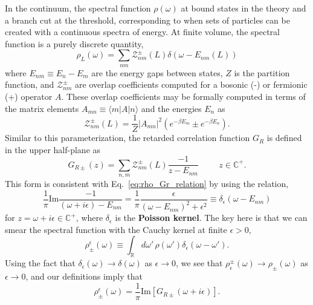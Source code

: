 In the continuum, the spectral function $\rho(\omega)$ at bound states in the theory and a branch cut at the threshold, corresponding to when sets of particles can be created with a continuous spectra of energy. At finite volume, the spectral function is a purely discrete quantity, 
\begin{equation}
    \rho_L(\omega) = \sum_{nm} \mathcal Z_{nm}^\pm(L) \delta(\omega - E_{nm}(L))
\end{equation}
where $E_{nm}\equiv E_n - E_m$ are the energy gaps between states, $Z$ is the partition function, and $\mathcal Z_{nm}^\pm$ are overlap coefficients computed for a bosonic (-) or fermionic (+) operator $A$. These overlap coefficients may be formally computed in terms of the matrix elements $A_{mn}\equiv \langle m | A | n\rangle$ and the energies $E_n$ as
\begin{equation}
    \mathcal Z_{nm}^\pm(L) = \frac{1}{Z} |A_{mn}|^2 (e^{-\beta E_m} \pm e^{-\beta E_n}).
\end{equation}
Similar to this parameterization, the retarded correlation function $G_R$ is defined in the upper half-plane as
\begin{equation}
    G_{R\pm}(z) = \sum_{n, m} \mathcal Z_{nm}^\pm(L) \frac{-1}{z - E_{nm}} \hspace{1cm} z\in\mathbb C^+.
\end{equation}
This form is consistent with Eq.~\eqref{eq:rho_Gr_relation} by using the relation,
\begin{equation}
    \frac{1}{\pi} \mathrm{Im}\frac{-1}{(\omega + i\epsilon) - E_{nm}} = \frac{1}{\pi} \frac{\epsilon}{(\omega - E_{nm})^2 + \epsilon^2} \equiv \delta_\epsilon(\omega - E_{nm})
\end{equation}
for $z = \omega + i\epsilon\in\mathbb C^+$, where $\delta_\epsilon$ is the \textbf{Poisson kernel}. The key here is that we can smear the spectral function with the Cauchy kernel at finite $\epsilon > 0$,
\begin{equation}
   \rho_\pm^\epsilon(\omega) \equiv \int_{\mathbb R} d\omega'\, \rho(\omega') \delta_\epsilon(\omega - \omega'). 
\end{equation}
Using the fact that $\delta_\epsilon(\omega)\rightarrow \delta(\omega)$ as $\epsilon\rightarrow 0$, we see that $\rho_\epsilon^\pm(\omega)\rightarrow\rho_\pm(\omega)$ as $\epsilon\rightarrow 0$, and our definitions imply that
\begin{equation}
    \rho_\pm^\epsilon(\omega) = \frac{1}{\pi} \mathrm{Im}[G_{R\pm}(\omega + i\epsilon)].
\end{equation}

